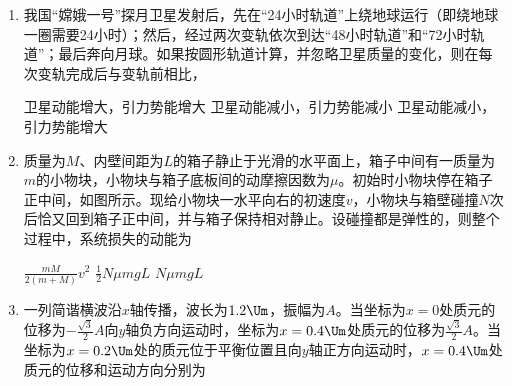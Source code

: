 \documentclass[\gkver]{gaokaozhenti}
\begin{document}
\begin{enumerate}
\item
我国“嫦娥一号”探月卫星发射后，先在“24小时轨道”上绕地球运行（即绕地球一圈需要24小时）；然后，经过两次变轨依次到达“48小时轨道”和“72小时轨道”；最后奔向月球。如果按圆形轨道计算，并忽略卫星质量的变化，则在每次变轨完成后与变轨前相比，

{卫星动能增大，引力势能增大}
{卫星动能减小，引力势能减小}
{卫星动能减小，引力势能增大}


\item
质量为$M$、内壁间距为$L$的箱子静止于光滑的水平面上，箱子中间有一质量为$m$的小物块，小物块与箱子底板间的动摩擦因数为$\mu$。初始时小物块停在箱子正中间，如图所示。现给小物块一水平向右的初速度$v$，小物块与箱壁碰撞$N$次后恰又回到箱子正中间，并与箱子保持相对静止。设碰撞都是弹性的，则整个过程中，系统损失的动能为


{$\frac{mM}{2(m+M)}v^{2}$}
{$\frac{1}{2}N\mu mgL$}
{$N\mu mgL$}


\item
一列简谐横波沿$x$轴传播，波长为$1.2\Um$，振幅为$A$。当坐标为$x=0$处质元的位移为$-\frac{\sqrt{3}}{2}A$向$y$轴负方向运动时，坐标为$x=0.4\Um$处质元的位移为$\frac{\sqrt{3}}{2}A$。当坐标为$x=0.2\Um$处的质元位于平衡位置且向$y$轴正方向运动时，$x=0.4\Um$处质元的位移和运动方向分别为


\end{enumerate}
\end{document}

